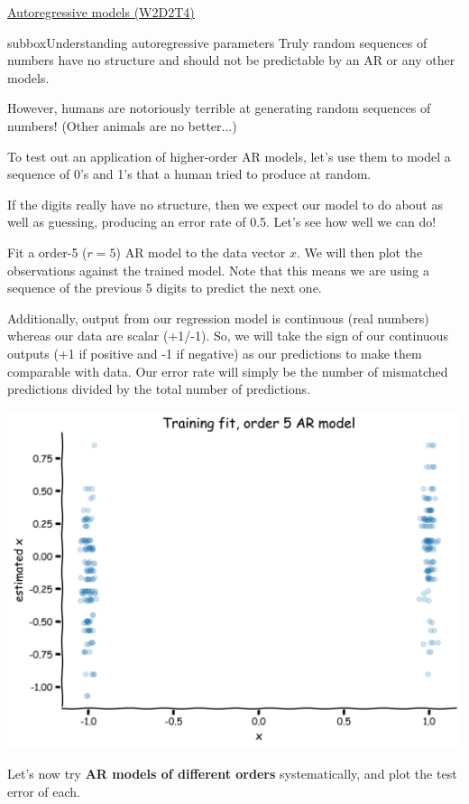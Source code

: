 \begin{textbox}{\href{https://compneuro.neuromatch.io/tutorials/W2D2_LinearSystems/student/W2D2_Tutorial4.html}{Autoregressive models (W2D2T4)} }

\begin{subbox}{subbox}{Understanding autoregressive parameters}
\scriptsize
Truly random sequences of numbers have no structure and should not be predictable by an AR or any other models.

However, humans are notoriously terrible at generating random sequences of numbers! (Other animals are no better...)

To test out an application of higher-order AR models, let's use them to model a sequence of 0's and 1's that a human tried to produce at random. 

If the digits really have no structure, then we expect our model to do about as well as guessing, producing an error rate of 0.5. Let's see how well we can do!

Fit a order-5 ($r=5$) AR model to the data vector $x$. We will then plot the observations against the trained model. Note that this means we are using a sequence of the previous 5 digits to predict the next one. 

Additionally, output from our regression model is continuous (real numbers) whereas our data are scalar (+1/-1). So, we will take the sign of our continuous outputs (+1 if positive and -1 if negative) as our predictions to make them comparable with data. Our error rate will simply be the number of mismatched predictions divided by the total number of predictions.
\begin{center}
\includegraphics[scale=0.1]{Figures/LS/CDS_Figure12.png}
\end{center}
Let's now try \textbf{AR models of different orders} systematically, and plot the test error of each.


\end{subbox}
\end{textbox}
